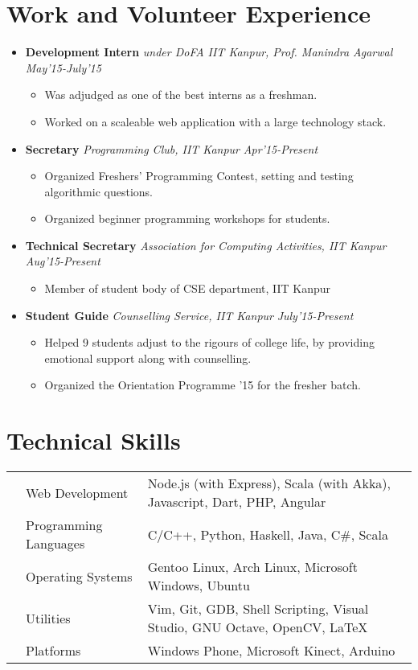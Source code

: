 \documentclass[11pt,a4paper]{moderncv}
\newcommand{\experience}[4]{
\vspace{0.1cm}
\item \textbf{\large{#1}} \emph{#2} \hfill \textit{#3}
  \begin{itemize}[leftmargin=*]
    \setlength\itemsep{0em} #4
  \end{itemize}
}
\begin{document}
\section*{Work and Volunteer Experience}
\begin{itemize}
  \setlength\itemsep{0.5em}
    \experience{Development Intern}{under DoFA IIT Kanpur, Prof. Manindra Agarwal}{May'15-July'15}{
      \item Was adjudged as one of the best interns as a freshman.
      \item Worked on a scaleable web application with a large technology stack.
      }

    \experience{Secretary}{Programming Club, IIT Kanpur}{Apr'15-Present}{
      \item Organized Freshers' Programming Contest, setting and testing algorithmic questions.
      \item Organized beginner programming workshops for students.
      }

    \experience{Technical Secretary}{Association for Computing Activities, IIT Kanpur}{Aug'15-Present}{
      \item Member of student body of CSE department, IIT Kanpur
      }

    \experience{Student Guide}{Counselling Service, IIT Kanpur}{July'15-Present}{
      \item Helped 9 students adjust to the rigours of college life, by providing emotional support along with counselling.
      \item Organized the Orientation Programme '15 for the fresher batch.
      }

\end{itemize}


\section*{Technical Skills}
\begin{tabular}{L{0.05cm} L{5cm} l}
  &Web Development 	          &Node.js (with Express), Scala (with Akka), Javascript, Dart, PHP, Angular\\
  &Programming Languages      &C/C++, Python, Haskell, Java, C\#, Scala\\
  &Operating Systems	        &Gentoo Linux, Arch Linux, Microsoft Windows, Ubuntu\\
  &Utilities                  &Vim, Git, GDB, Shell Scripting, Visual Studio, GNU Octave, OpenCV, \LaTeX\\
  &Platforms                  &Windows Phone, Microsoft Kinect, Arduino\\
\end{tabular}
\end{document}
